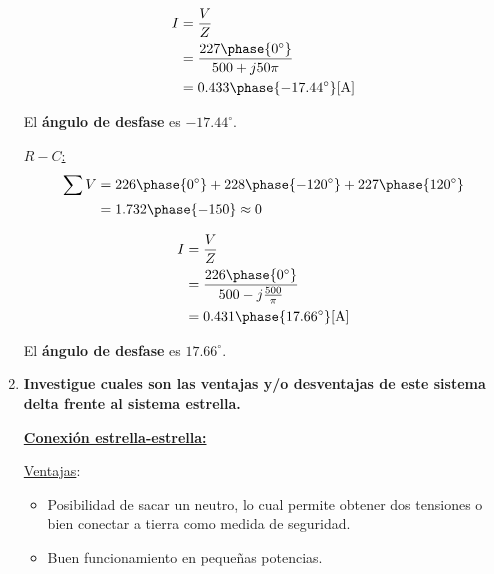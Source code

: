 \documentclass[letter,11pt]{article}
\begin{document}
\begin{enumerate}

\begin{equation*}
    \begin{split}
        I &=\frac{V}{Z}\\
          &=\frac{227\phase{0^{\circ}}}{500+j50\pi}\\
          &=0.433\phase{-17.44^{\circ}}[\text{A}]\\
    \end{split}
\end{equation*}

El \textbf{ángulo de desfase} es $-17.44^{\circ}$.

\underline{$R-C$:}
\begin{equation*}
    \begin{split}
        \sum V &= 226\phase{0^{\circ}}+228\phase{-120^{\circ}}+227\phase{120^{\circ}}\\
               &= 1.732\phase{-150} \approx 0
    \end{split}
\end{equation*}


\begin{equation*}
    \begin{split}
        I &=\frac{V}{Z}\\
          &=\frac{226\phase{0^{\circ}}}{500-j\frac{500}{\pi}}\\
          &=0.431\phase{17.66^{\circ}}[\text{A}]\\
    \end{split}
\end{equation*}

El \textbf{ángulo de desfase} es $17.66^{\circ}$.

\item \textbf{Investigue cuales son las ventajas y/o desventajas de este sistema
delta frente al sistema estrella.}

\underline{\textbf{Conexión estrella-estrella:}}

\underline{Ventajas}:
\begin{itemize}
    \item Posibilidad de sacar un neutro, lo cual permite obtener dos tensiones
        o bien conectar a tierra como medida de seguridad.
    \item Buen funcionamiento en pequeñas potencias.
\end{itemize}


\end{enumerate}
\end{document}
